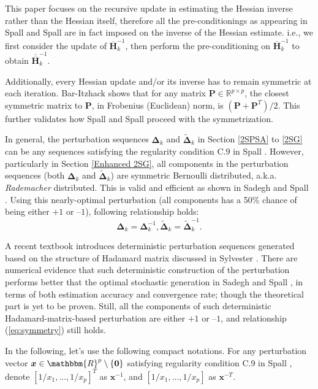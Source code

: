 \documentclass[conference]{IEEEtran}
\newcommand{\bDelta}{\bm{\Delta}}
\newcommand{\oH}{\bm{\overline{H}}}
\newcommand{\ooH}{\bm{\overline{\overline{H}}}}
\newcommand{\tDelta}{\bm{\tilde{\Delta}}}
\begin{document}
	This paper focuses on the recursive update in estimating the Hessian inverse rather than the Hessian itself, therefore all the pre-conditionings as appearing in Spall \cite{Spall2000} and Spall \cite{Spall2009} are in fact imposed on the inverse of the Hessian estimate. i.e., we first consider the update of $ \oH_k^{-1} $, then perform the pre-conditioning on $ \oH_k^{-1} $ to obtain $ \ooH_k^{-1} $.
	
	Additionally, every Hessian update and/or its inverse has to remain symmetric at each iteration. Bar-Itzhack \cite{Bar-Itzhack1998} shows that for any matrix $ \bm{P}\in\mathbb{R}^{p\times p} $, the closest symmetric matrix to $ \bm{P} $, in Frobenius (Euclidean) norm, is $ (\bm{P}+\bm{P}^T)/2 $. This further validates how Spall \cite{Spall2000} and Spall \cite{Spall2009} proceed with the symmetrization.
	
	In general, the perturbation sequences $\bDelta_k$ and $\tDelta_k$ in Section \ref{2SPSA} to \ref{2SG} can be any sequences satisfying the regularity condition C.9 in Spall \cite{Spall2009}. However, particularly in Section \ref{Enhanced 2SG}, all components in the perturbation sequences (both $ \bDelta_k $ and $ \tDelta_k $) are symmetric Bernoulli distributed, a.k.a. \textit{Rademacher} distributed. This is valid and efficient as shown in Sadegh and Spall \cite{Sadegh1998}. Using this nearly-optimal perturbation (all components has a 50\% chance of being either $+1$ or $\text{--}1$), following relationship holds:
	\begin{equation} \label{eq:symmetry}
	\bDelta_k=\bDelta_k^{-1}, \tDelta_k=\tDelta_k^{-1}.
	\end{equation}
	
	A recent textbook \cite{Bhatnagar2012} introduces deterministic perturbation sequences generated based on the structure of Hadamard matrix discussed in Sylvester \cite{Sylvester1867}. There are numerical evidence that such deterministic construction of the perturbation performs better that the optimal stochastic generation in Sadegh and Spall \cite{Sadegh1998}, in terms of both estimation accuracy and convergence rate; though the theoretical part is yet to be proven. Still, all the components of such deterministic Hadamard-matrix-based perturbation are either $+1$ or $\text{--}1$, and relationship (\ref{eq:symmetry}) still holds.
	
	In the following, let's use the following compact notations. For any perturbation vector $ \bm{x}\in \mathbbm{R}^p \setminus \{\bm{0}\}  $ satisfying regularity condition C.9 in Spall \cite{Spall2009} , denote $ [1/x_1, ..., 1/x_p]^T $ as $ \bm{x}^{-1} $, and $ [1/x_1, ..., 1/x_p] $ as $ \bm{x}^{-T} $.
		
\end{document}
